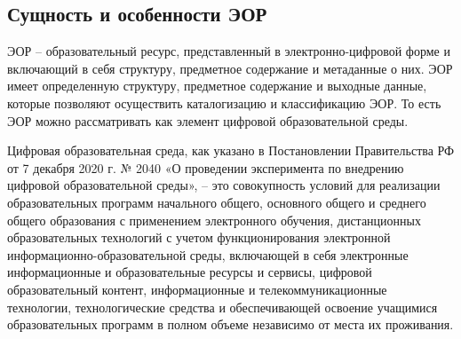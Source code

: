 \subsection{Сущность и особенности ЭОР}
ЭОР – образовательный ресурс, представленный в электронно-цифровой форме и включающий в себя структуру, предметное содержание и метаданные о них. ЭОР имеет определенную структуру, предметное содержание и выходные данные, которые позволяют осуществить каталогизацию и классификацию ЭОР\cite{2}. То есть ЭОР можно рассматривать как элемент цифровой образовательной среды. 

Цифровая образовательная среда, как указано в Постановлении Правительства РФ от 7 декабря 2020 г. № 2040 «О проведении эксперимента по внедрению цифровой образовательной среды», – это совокупность условий для реализации образовательных программ начального общего, основного общего и среднего общего образования с применением электронного обучения, дистанционных образовательных технологий с учетом функционирования электронной информационно-образовательной среды, включающей в себя электронные информационные и образовательные ресурсы и сервисы, цифровой образовательный контент, информационные и телекоммуникационные технологии, технологические средства и обеспечивающей освоение учащимися образовательных программ в полном объеме независимо от места их проживания.

